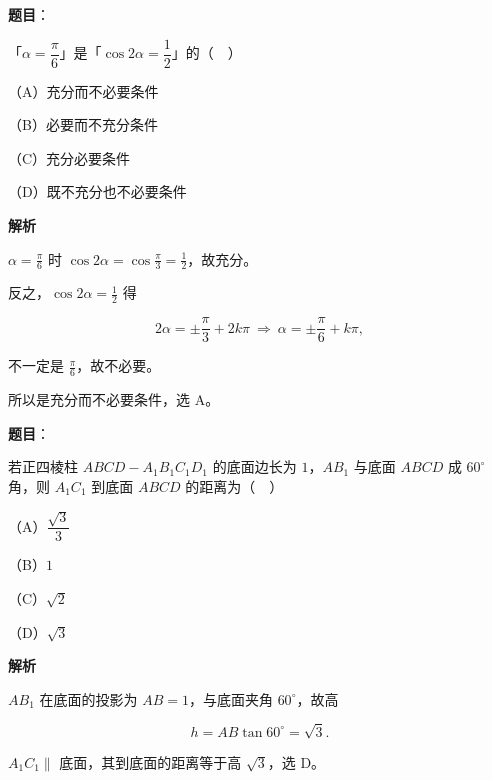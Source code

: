\begin{answer}

\textbf{题目}：

「$\alpha=\dfrac{\pi}{6}$」是「$\cos2\alpha=\dfrac12$」的（　）

（A）充分而不必要条件

（B）必要而不充分条件

（C）充分必要条件

（D）既不充分也不必要条件

\textbf{解析}

$\alpha=\frac\pi6$ 时 $\cos2\alpha=\cos\frac\pi3=\frac12$，故充分。

反之，$\cos2\alpha=\frac12$ 得

\nopagebreak[4]
\[2\alpha=\pm\frac\pi3+2k\pi\ \Longrightarrow\ \alpha=\pm\frac\pi6+k\pi,\]

不一定是 $\frac\pi6$，故不必要。

所以是充分而不必要条件，选 A。


\end{answer}
\begin{answer}

\textbf{题目}：

若正四棱柱 $ABCD-A_1B_1C_1D_1$ 的底面边长为 $1$，$AB_1$ 与底面 $ABCD$ 成 $60^\circ$ 角，则 $A_1C_1$ 到底面 $ABCD$ 的距离为（　）

（A）$\dfrac{\sqrt3}{3}$

（B）$1$

（C）$\sqrt2$

（D）$\sqrt3$

\textbf{解析}

$AB_1$ 在底面的投影为 $AB=1$，与底面夹角 $60^\circ$，故高

\nopagebreak[4]
\[h=AB\tan60^\circ=\sqrt3 .\]

$A_1C_1\parallel$ 底面，其到底面的距离等于高 $\sqrt3$，选 D。


\end{answer}
